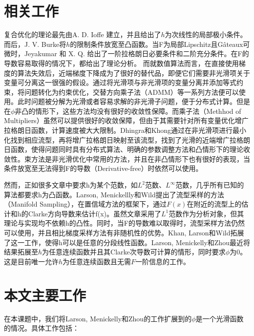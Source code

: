 \documentclass[macfonts]{njuthesis}
\begin{document}
\section{相关工作}
复合优化的理论最先由A. D. Ioffe \cite{IoffeAD1979}建立，并且给出了$h$为次线性的局部极小条件。而后，J. V. Burke\cite{BerkeJV1987}将$h$的限制条件放宽至凸函数。当F为局部Lipschitz且Gâteaux可微时，Jeyakumar 和 X. Q. \cite{Lagrange}给出了一阶拉格朗日必要条件和二阶充分条件。在F的导数容易取得的情况下，\cite{comp21,comp22,comp56}都给出了理论分析。
而就数值算法而言，在直接使用梯度的算法失效后，近端梯度下降\cite{proximal,accproximal}成为了很好的替代品，即便它们需要非光滑项关于变量可分离这一很强的假设。通过将光滑项与非光滑项的变量分离并添加等式约束，将问题转化为约束优化，交替方向乘子法（ADMM）\cite{ADMM}等一系列方法便可以使用。此时问题被分解为光滑或者容易求解的非光滑子问题，便于分布式计算。但是在$\phi$非凸的情形下，这些方法均没有很好的收敛性保障。而乘子法（Methhod of Multipliers）\cite{MM}虽然可以提供很好的收敛保障，但由于其需要针对所有变量优化增广拉格朗日函数，计算速度被大大限制。Dhingra和Khong\cite{proximalauglag}通过在非光滑项进行最小化找到相应流型，再将增广拉格朗日映射至该流型，找到了光滑的近端增广拉格朗日函数，使得问题同时具有分布式算法、明确的参数调整方法和凸情形下的理论收敛性。束方法\cite{bundle,bundle2,bundle3}是非光滑优化中常用的方法，并且在非凸情形下也有很好的表现，当条件放宽至无法得到F的导数（Derivative-free）时依然可以使用\cite{bundlefree1,bundlefree2}。
\par
然而，正如很多文章中要求h为某个范数，如$L^2$范数\cite{comp55}、$L^{\infty}$范数\cite{comp44,comp56}，几乎所有已知的算法都要求h为凸函数。Larson, Menickellly和Wild\cite{manifoldl1}提出了流型采样的方法（Manifold Sampling），在置信域方法的框架下，通过$F(x)$在附近的流型上的估计和h的Clarke方向导数来估计f(x)。虽然文章采用了$L^{1}$范数作为分析对象，但其理论与实现均不依赖h的凸性。同时，当F的导数难以取得时，流型采样方法仍然可以使用，并且相比梯度采样方法\cite{grasam1,grasam2}有非随机性的优势。Khan, Larson和Wild\cite{manifoldpiecewiselinear}拓展了这一工作，使得h可以是任意的分段线性函数。Larson, Menickelly和Zhou\cite{manifold}最近将结果拓展至$h$为任意连续函数并且其Clarke次导数可计算的情形，同时要求$\phi$为0。这是目前唯一允许$h$为任意连续函数且无需$F$一阶信息的工作。
\section{本文主要工作}
在本课题中，我们将Larson, Menickelly和Zhou的工作\cite{manifold}扩展到的$\phi$是一个光滑函数的情况。具体工作包括：
\end{document}
